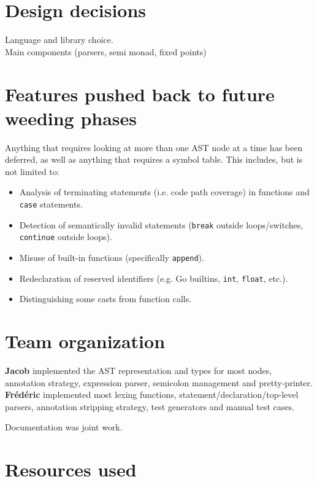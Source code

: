 \documentclass[letterpaper,11pt]{article}
\begin{document}
\section{Design decisions}

Language and library choice.
\\
Main components (parsers, semi monad, fixed points)

\section{Features pushed back to future weeding phases}

Anything that requires looking at more than one AST node at a time has been deferred, as well as anything that requires a symbol table. This includes, but is not limited to:
\begin{itemize}
\item Analysis of terminating statements (i.e. code path coverage) in functions and \texttt{case} statements.
\item Detection of semantically invalid statements (\texttt{break} outside loops/switches, \texttt{continue} outside loops).
\item Misuse of built-in functions (specifically \texttt{append}).
\item Redeclaration of reserved identifiers (e.g. Go builtins, \texttt{int}, \texttt{float}, etc.).
\item Distinguishing some casts from function calls.
\end{itemize}

\section{Team organization}

\textbf{Jacob} implemented the AST representation and types for most nodes, annotation strategy, expression parser, semicolon management and pretty-printer.
\\
\textbf{Fr\'ed\'eric} implemented most lexing functions, statement/declaration/top-level parsers, annotation stripping strategy, test generators and manual test cases.

Documentation was joint work.

\section{Resources used}
\end{document}
